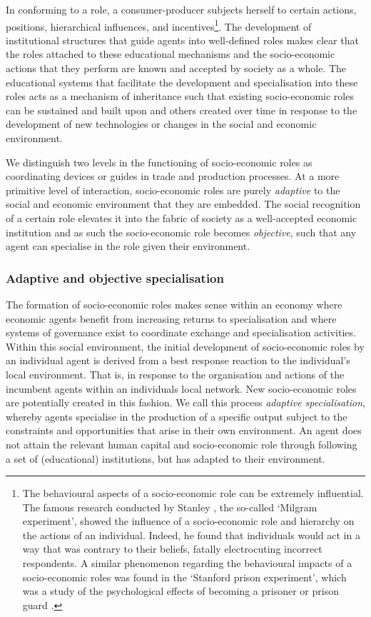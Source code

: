 In conforming to a role, a consumer-producer subjects herself to certain actions, positions, hierarchical influences, and incentives\footnote{The behavioural aspects of a socio-economic role can be extremely influential. The famous research conducted by Stanley \citet{Milgram1963}, the so-called `Milgram experiment', showed the influence of a socio-economic role and hierarchy on the actions of an individual. Indeed, he found that individuals would act in a way that was contrary to their beliefs, fatally electrocuting incorrect respondents. A similar phenomenon regarding the behavioural impacts of a socio-economic roles was found in the `Stanford prison experiment', which was a study of the psychological effects of becoming a prisoner or prison guard \citep{Zimbardo1971}.}. The development of institutional structures that guide agents into well-defined roles makes clear that the roles attached to these educational mechanisms and the socio-economic actions that they perform are known and accepted by society as a whole. The educational systems that facilitate the development and specialisation into these roles acts as a mechanism of inheritance such that existing socio-economic roles can be sustained and built upon and others created over time in response to the development of new technologies or changes in the social and economic environment.

We distinguish two levels in the functioning of socio-economic roles as coordinating devices or guides in trade and production processes. At a more primitive level of interaction, socio-economic roles are purely \emph{adaptive} to the social and economic environment that they are embedded. The social recognition of a certain role elevates it into the fabric of society as a well-accepted economic institution and as such the socio-economic role becomes \emph{objective}, such that any agent can specialise in the role given their environment.

\subsubsection{Adaptive and objective specialisation}

The formation of socio-economic roles makes sense within an economy where economic agents benefit from increasing returns to specialisation and where systems of governance exist to coordinate exchange and specialisation activities. Within this social environment, the initial development of socio-economic roles by an individual agent is derived from a best response reaction to the individual's local environment. That is, in response to the organisation and actions of the incumbent agents within an individuals local network. New socio-economic roles are potentially created in this fashion. We call this process \emph{adaptive specialisation}, whereby agents specialise in the production of a specific output subject to the constraints and opportunities that arise in their own environment. An agent does not attain the relevant human capital and socio-economic role through following a set of (educational) institutions, but has adapted to their environment.

